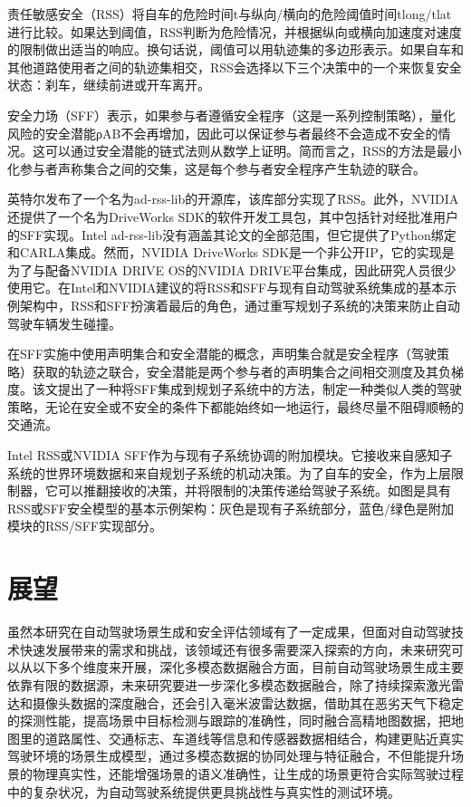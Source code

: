 责任敏感安全（RSS）将自车的危险时间t与纵向/横向的危险阈值时间tlong/tlat进行比较。如果达到阈值，RSS判断为危险情况，并根据纵向或横向加速度对速度的限制做出适当的响应。换句话说，阈值可以用轨迹集的多边形表示。如果自车和其他道路使用者之间的轨迹集相交，RSS会选择以下三个决策中的一个来恢复安全状态：刹车，继续前进或开车离开。

安全力场（SFF）表示，如果参与者遵循安全程序（这是一系列控制策略），量化风险的安全潜能ρAB不会再增加，因此可以保证参与者最终不会造成不安全的情况。这可以通过安全潜能的链式法则从数学上证明。简而言之，RSS的方法是最小化参与者声称集合之间的交集，这是每个参与者安全程序产生轨迹的联合。

英特尔发布了一个名为ad-rss-lib的开源库，该库部分实现了RSS。此外，NVIDIA还提供了一个名为DriveWorks SDK的软件开发工具包，其中包括针对经批准用户的SFF实现。Intel ad-rss-lib没有涵盖其论文的全部范围，但它提供了Python绑定和CARLA集成。然而，NVIDIA DriveWorks SDK是一个非公开IP，它的实现是为了与配备NVIDIA DRIVE OS的NVIDIA DRIVE平台集成，因此研究人员很少使用它。在Intel和NVIDIA建议的将RSS和SFF与现有自动驾驶系统集成的基本示例架构中，RSS和SFF扮演着最后的角色，通过重写规划子系统的决策来防止自动驾驶车辆发生碰撞。

在SFF实施中使用声明集合和安全潜能的概念，声明集合就是安全程序（驾驶策略）获取的轨迹之联合，安全潜能是两个参与者的声明集合之间相交测度及其负梯度。该文提出了一种将SFF集成到规划子系统中的方法，制定一种类似人类的驾驶策略，无论在安全或不安全的条件下都能始终如一地运行，最终尽量不阻碍顺畅的交通流。

Intel RSS或NVIDIA SFF作为与现有子系统协调的附加模块。它接收来自感知子系统的世界环境数据和来自规划子系统的机动决策。为了自车的安全，作为上层限制器，它可以推翻接收的决策，并将限制的决策传递给驾驶子系统。如图是具有RSS或SFF安全模型的基本示例架构：灰色是现有子系统部分，蓝色/绿色是附加模块的RSS/SFF实现部分。

\section{展望}


虽然本研究在自动驾驶场景生成和安全评估领域有了一定成果，但面对自动驾驶技术快速发展带来的需求和挑战，该领域还有很多需要深入探索的方向，未来研究可以从以下多个维度来开展，深化多模态数据融合方面，目前自动驾驶场景生成主要依靠有限的数据源，未来研究要进一步深化多模态数据融合，除了持续探索激光雷达和摄像头数据的深度融合，还会引入毫米波雷达数据，借助其在恶劣天气下稳定的探测性能，提高场景中目标检测与跟踪的准确性，同时融合高精地图数据，把地图里的道路属性、交通标志、车道线等信息和传感器数据相结合，构建更贴近真实驾驶环境的场景生成模型，通过多模态数据的协同处理与特征融合，不但能提升场景的物理真实性，还能增强场景的语义准确性，让生成的场景更符合实际驾驶过程中的复杂状况，为自动驾驶系统提供更具挑战性与真实性的测试环境。​

